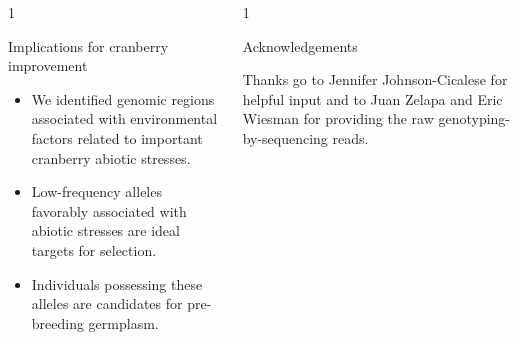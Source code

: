 \documentclass[final]{beamer}
\newlength{\onecolwid}
\newlength{\twocolwid}
\begin{document}
\begin{frame}[t]
\begin{columns}[t]
\begin{column}{\twocolwid}
\begin{columns}[t,totalwidth=\twocolwid]
\begin{column}{1\onecolwid}
\begin{alertblock}{Implications for cranberry improvement}

\begin{large}
\begin{itemize}
  \item{We identified genomic regions associated with environmental factors related to important cranberry abiotic stresses.}
  \item{Low-frequency alleles favorably associated with abiotic stresses are ideal targets for selection.}
  \item{Individuals possessing these alleles are candidates for pre-breeding germplasm.}
\end{itemize}
\end{large}



\end{alertblock}


\end{column}





\begin{column}{1\onecolwid}






\begin{block}{\large{Acknowledgements}}

\begin{footnotesize}

Thanks go to Jennifer Johnson-Cicalese for helpful input and to Juan Zelapa and Eric Wiesman for providing the raw genotyping-by-sequencing reads.

\end{footnotesize}

\end{block}




\end{column}
\end{columns}
\end{column}
\end{columns}
\end{frame}
\end{document}
